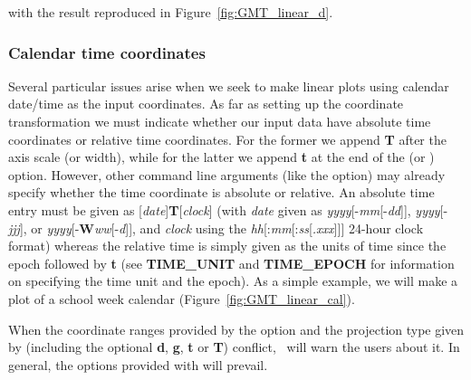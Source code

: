 
\noindent
with the result reproduced in Figure~\ref{fig:GMT_linear_d}.

\subsubsection{Calendar time coordinates}
\label{sec:time}


Several particular issues arise when we seek to make linear plots using calendar date/time as
the input coordinates.  As far as setting up the coordinate transformation we must indicate whether
our input data have absolute time coordinates or relative time coordinates.  For the
former we append \textbf{T} after the axis scale (or width), while for the latter we append \textbf{t} at the
end of the  (or ) option.
However, other command line arguments (like the  option) may already specify whether the time
coordinate is absolute or relative. An
absolute time entry must be given as [\emph{date}]\textbf{T}[\emph{clock}]
(with \emph{date} given as \emph{yyyy}[-\emph{mm}[-\emph{dd}]], \emph{yyyy}[-\emph{jjj}], or \emph{yyyy}[-\textbf{W}\emph{ww}[-\emph{d}]], and \emph{clock} using
the \emph{hh}[:\emph{mm}[:\emph{ss}[\emph{.xxx}]]] 24-hour clock format) whereas the relative time is simply
given as the units of time since the epoch followed by \textbf{t} (see \textbf{TIME\_UNIT} and \textbf{TIME\_EPOCH} for information
on specifying the time unit and the epoch).  As a simple example, we will make a plot of a school week
calendar (Figure~\ref{fig:GMT_linear_cal}).


When the coordinate ranges provided by the  option and the projection type given by 
(including the optional \textbf{d}, \textbf{g}, \textbf{t} or \textbf{T}) conflict, \GMT\ will warn the
users about it. In general, the options provided with  will prevail.



